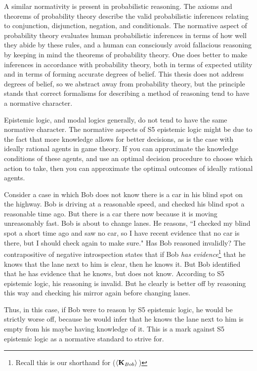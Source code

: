 A similar normativity is present in probabilistic reasoning. The axioms and theorems of probability theory describe the valid probabilistic inferences relating to conjunction, disjunction, negation, and conditionals. The normative aspect of probability theory evaluates human probabilistic inferences in terms of how well they abide by these rules, and a human can consciously avoid fallacious reasoning by keeping in mind the theorems of probability theory. One does better to make inferences in accordance with probability theory, both in terms of expected utility and in terms of forming accurate degrees of belief. This thesis does not address degrees of belief, so we abstract away from probability theory, but the principle stands that correct formalisms for describing a method of reasoning tend to have a normative character.

Epistemic logic, and modal logics generally, do not tend to have the same normative character. The normative aspects of S5 epistemic logic might be due to the fact that more knowledge allows for better decisions, as is the case with ideally rational agents in game theory. If you can approximate the knowledge conditions of these agents, and use an optimal decision procedure to choose which action to take, then you can approximate the optimal outcomes of ideally rational agents. 

Consider a case in which Bob does not know there is a car in his blind spot on the highway. Bob is driving at a reasonable speed, and checked his blind spot a reasonable time ago. But there is a car there now because it is moving unreasonably fast. Bob is about to change lanes. He reasons, ``I checked my blind spot a short time ago and saw no car, so I have recent evidence that no car is there, but I should check again to make sure." Has Bob reasoned invalidly? The contrapositive of negative introspection states that if Bob \emph{has evidence}\footnote{Recall this is our shorthand for ($\langle \mathbf{K}_{Bob} \rangle\,$)} that he knows that the lane next to him is clear, then he knows it. But Bob identified that he has evidence that he knows, but does not know. According to S5 epistemic logic, his reasoning is invalid. But he clearly is better off by reasoning this way and checking his mirror again before changing lanes.

Thus, in this case, if Bob were to reason by S5 epistemic logic, he would be strictly worse off, because he would infer that he knows the lane next to him is empty from his maybe having knowledge of it. This is a mark against S5 epistemic logic as a normative standard to strive for.

